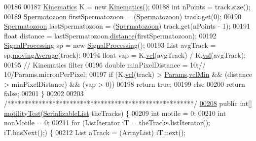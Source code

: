 \begin{DoxyCode}
00186 
00187     \hyperlink{classfunctions_1_1_kinematics}{Kinematics} K = \textcolor{keyword}{new} \hyperlink{classfunctions_1_1_kinematics}{Kinematics}();
00188     \textcolor{keywordtype}{int} nPoints = track.size();
00189     \hyperlink{classdata_1_1_spermatozoon}{Spermatozoon} firstSpermatozoon = (\hyperlink{classdata_1_1_spermatozoon}{Spermatozoon}) track.get(0);
00190     \hyperlink{classdata_1_1_spermatozoon}{Spermatozoon} lastSpermatozoon = (\hyperlink{classdata_1_1_spermatozoon}{Spermatozoon}) track.get(nPoints - 1);
00191     \textcolor{keywordtype}{float} distance = lastSpermatozoon.\hyperlink{classdata_1_1_spermatozoon_aaef7a8e7602a08c82ea5fcbb777883e0}{distance}(firstSpermatozoon);
00192     \hyperlink{classfunctions_1_1_signal_processing}{SignalProcessing} sp = \textcolor{keyword}{new} \hyperlink{classfunctions_1_1_signal_processing}{SignalProcessing}();
00193     List avgTrack = sp.\hyperlink{classfunctions_1_1_signal_processing_a4f10245c50d850b87d1ef4d81c28300d}{movingAverage}(track);
00194     \textcolor{keywordtype}{float} vap = K.\hyperlink{classfunctions_1_1_kinematics_af6e1e75567a927a9c627616cb68b0d7f}{vcl}(avgTrack) / K.\hyperlink{classfunctions_1_1_kinematics_a938c4a9daa152f426259a01bc6654b25}{vsl}(avgTrack);
00195     \textcolor{comment}{// Kinematics filter}
00196     \textcolor{keywordtype}{double} minPixelDistance = 10;\textcolor{comment}{// 10/Params.micronPerPixel;}
00197     \textcolor{keywordflow}{if} (K.\hyperlink{classfunctions_1_1_kinematics_af6e1e75567a927a9c627616cb68b0d7f}{vcl}(track) > \hyperlink{classdata_1_1_params}{Params}.\hyperlink{classdata_1_1_params_af4cb43f0bfe24c14e75780187235376c}{vclMin} && (distance > minPixelDistance) && (vap > 0))
00198       \textcolor{keywordflow}{return} \textcolor{keyword}{true};
00199     \textcolor{keywordflow}{else}
00200       \textcolor{keywordflow}{return} \textcolor{keyword}{false};
00201   \}
00202 
00203   \textcolor{comment}{/******************************************************/}
\hypertarget{_kinematics_8java_source_l00208}{}\hyperlink{classfunctions_1_1_kinematics_a0bde63a25091ffc7c7af6d9fffe78034}{00208}   \textcolor{keyword}{public} \textcolor{keywordtype}{int}[] \hyperlink{classfunctions_1_1_kinematics_a0bde63a25091ffc7c7af6d9fffe78034}{motilityTest}(\hyperlink{classdata_1_1_serializable_list}{SerializableList} theTracks) \{
00209     \textcolor{keywordtype}{int} motile = 0;
00210     \textcolor{keywordtype}{int} nonMotile = 0;
00211     \textcolor{keywordflow}{for} (ListIterator iT = theTracks.listIterator(); iT.hasNext();) \{
00212       List aTrack = (ArrayList) iT.next();

\end{DoxyCode}
